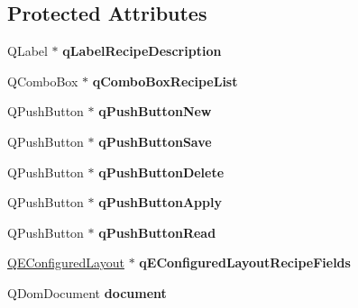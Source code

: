 \subsection*{Protected Attributes}
\begin{DoxyCompactItemize}
\item 
\hypertarget{classQERecipe_afbcf98fb5aa625dd0f5bbce448f9abc6}{
QLabel $\ast$ {\bfseries qLabelRecipeDescription}}
\label{classQERecipe_afbcf98fb5aa625dd0f5bbce448f9abc6}

\item 
\hypertarget{classQERecipe_aa57c5458e53e726013d96b6d4828d417}{
QComboBox $\ast$ {\bfseries qComboBoxRecipeList}}
\label{classQERecipe_aa57c5458e53e726013d96b6d4828d417}

\item 
\hypertarget{classQERecipe_a8f2ad2d538ae4c91ea7bea458dc3fa4f}{
QPushButton $\ast$ {\bfseries qPushButtonNew}}
\label{classQERecipe_a8f2ad2d538ae4c91ea7bea458dc3fa4f}

\item 
\hypertarget{classQERecipe_a506702b967ecf90b373fa4a201ab88bc}{
QPushButton $\ast$ {\bfseries qPushButtonSave}}
\label{classQERecipe_a506702b967ecf90b373fa4a201ab88bc}

\item 
\hypertarget{classQERecipe_a03479a28aaea929e49076656d0a51c2e}{
QPushButton $\ast$ {\bfseries qPushButtonDelete}}
\label{classQERecipe_a03479a28aaea929e49076656d0a51c2e}

\item 
\hypertarget{classQERecipe_a2f2b3b40838cbf2632e68a014e2fbf69}{
QPushButton $\ast$ {\bfseries qPushButtonApply}}
\label{classQERecipe_a2f2b3b40838cbf2632e68a014e2fbf69}

\item 
\hypertarget{classQERecipe_a23119c51579215710be8f9d484a04f77}{
QPushButton $\ast$ {\bfseries qPushButtonRead}}
\label{classQERecipe_a23119c51579215710be8f9d484a04f77}

\item 
\hypertarget{classQERecipe_a95b66354526e9d54001b051d44df6294}{
\hyperlink{classQEConfiguredLayout}{QEConfiguredLayout} $\ast$ {\bfseries qEConfiguredLayoutRecipeFields}}
\label{classQERecipe_a95b66354526e9d54001b051d44df6294}

\item 
\hypertarget{classQERecipe_aa506079a1bedbb05903511244720a049}{
QDomDocument {\bfseries document}}
\label{classQERecipe_aa506079a1bedbb05903511244720a049}


\end{DoxyCompactItemize}

